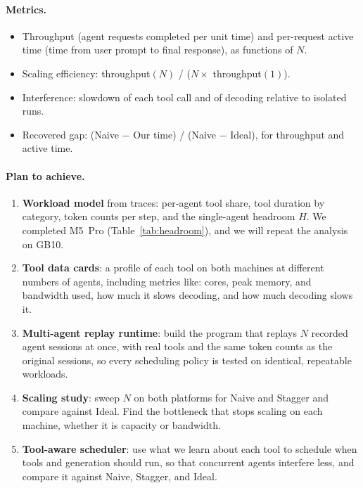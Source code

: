 \documentclass[11pt]{article}
\begin{document}
\paragraph{Metrics.}
\begin{itemize}
  \item Throughput (agent requests completed per unit time) and per-request active time (time from user prompt to final response), as functions of $N$.
  \item Scaling efficiency: throughput$(N)$ / ($N \times$ throughput$(1)$).
  \item Interference: slowdown of each tool call and of decoding relative to isolated runs.
  \item Recovered gap: (Naive $-$ Our time) / (Naive $-$ Ideal), for throughput and active time.
\end{itemize}


\paragraph{Plan to achieve.}
\begin{enumerate}
  \item \textbf{Workload model} from traces: per-agent tool share, tool
    duration by category, token counts per step, and the single-agent headroom
    $H$. We completed M5~Pro (Table~\ref{tab:headroom}), and we will repeat the
    analysis on GB10.
  \item \textbf{Tool data cards}: a profile of each tool on both machines at different numbers of agents, including metrics like: cores, peak memory, and bandwidth used, how much it slows decoding, and how much decoding slows it.
  \item \textbf{Multi-agent replay runtime}: build the program that replays $N$ recorded agent sessions at once, with real tools and the same token counts as the original sessions, so every scheduling policy is tested on identical, repeatable workloads.
  \item \textbf{Scaling study}: sweep $N$ on both platforms for Naive and
    Stagger and compare against Ideal. Find the bottleneck that stops scaling
    on each machine, whether it is capacity or bandwidth.
  \item \textbf{Tool-aware scheduler}: use what we learn about each tool to
    schedule when tools and generation should run, so that concurrent agents
    interfere less, and compare it against Naive, Stagger, and Ideal.
\end{enumerate}
\end{document}
